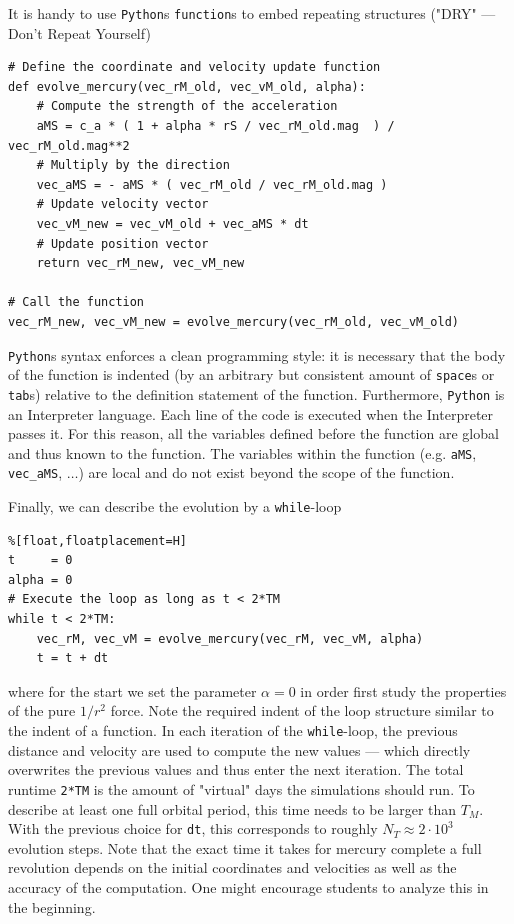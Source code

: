 \documentclass[12pt,ngerman,american]{iopart}
\newcommand{\python}[0]{\texttt{Python}}
\begin{document}
It is handy to use \texttt{Python}s \texttt{function}s to embed repeating structures ("DRY" --- Don't Repeat Yourself)
\begin{lstlisting}
# Define the coordinate and velocity update function
def evolve_mercury(vec_rM_old, vec_vM_old, alpha):
	# Compute the strength of the acceleration
	aMS = c_a * ( 1 + alpha * rS / vec_rM_old.mag  ) / vec_rM_old.mag**2
	# Multiply by the direction
	vec_aMS = - aMS * ( vec_rM_old / vec_rM_old.mag )
	# Update velocity vector
	vec_vM_new = vec_vM_old + vec_aMS * dt
	# Update position vector
	return vec_rM_new, vec_vM_new

# Call the function
vec_rM_new, vec_vM_new = evolve_mercury(vec_rM_old, vec_vM_old)
\end{lstlisting}
\python{}s syntax enforces a clean programming style: it is necessary that the body of the function is indented (by an arbitrary but consistent amount of \texttt{space}s or \texttt{tab}s) relative to the definition statement of the function.
Furthermore, \python{} is an Interpreter language.
Each line of the code is executed when the Interpreter passes it.
For this reason, all the variables defined before the function are global and thus known to the function.
The variables within the function (e.g. \texttt{aMS}, \texttt{vec\_aMS}, $\dots$) are local and do not exist beyond the scope of the function.

Finally, we can describe the evolution by a \texttt{while}-loop
\begin{lstlisting}%[float,floatplacement=H]
t     = 0
alpha = 0
# Execute the loop as long as t < 2*TM
while t < 2*TM:
	vec_rM, vec_vM = evolve_mercury(vec_rM, vec_vM, alpha)
	t = t + dt
\end{lstlisting}
where for the start we set the parameter $\alpha=0$ in order first study the properties of the pure 
$1/r^2$ force.
Note the required indent of the loop structure similar to the indent of a function.
In each iteration of the \texttt{while}-loop, the previous distance and velocity are used to compute the new values --- which directly overwrites the previous values and thus enter the next iteration.
The total runtime \texttt{2*TM} is the amount of "virtual" days the simulations should run.
To describe at least one full orbital period, this time needs to be larger than $T_M$.
With the previous choice for \texttt{dt}, this corresponds to roughly $N_T \approx 2 \cdot 10^3$ evolution steps.
Note that the exact time it takes for mercury complete a full revolution depends on the initial coordinates and velocities as well as the accuracy of the computation.
One might encourage students to analyze this in the beginning.
\end{document}
